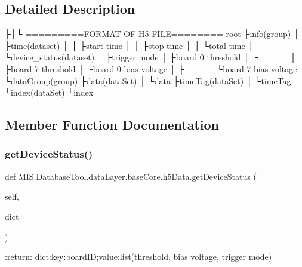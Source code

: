 \subsection{Detailed Description}
\begin{DoxyVerb}├│└
=========FORMAT OF H5 FILE========
root
 ├info(group)
 │ ├time(dataset)
 │ │ ├start time
 │ │ ├stop time
 │ │ └total time
 │ └device_status(dataset)
 │   ├trigger mode
 │   ├board 0 threshold
 │   ├~~~~~~~
 │   ├board 7 threshold
 │   ├board 0 bias voltage
 │   ├~~~~~
 │   └board 7 bias voltage
 └dataGroup(group)
    ├data(dataSet)
    │ └data
    ├timeTag(dataSet)
    │ └timeTag
    └index(dataSet)
      └index
\end{DoxyVerb}
 

\subsection{Member Function Documentation}
\mbox{\label{classMIS_1_1DatabaseTool_1_1dataLayer_1_1baseCore_1_1h5Data_a134c9bcf417cc9a85ddd6ea4f916f378}} 
\subsubsection{\texorpdfstring{get\+Device\+Status()}{getDeviceStatus()}}
{\footnotesize\ttfamily def M\+I\+S.\+Database\+Tool.\+data\+Layer.\+base\+Core.\+h5\+Data.\+get\+Device\+Status (\begin{DoxyParamCaption}\item[{}]{self,  }\item[{}]{dict }\end{DoxyParamCaption})}

\begin{DoxyVerb}:return: dict:key:boardID;value:list(threshold, bias voltage, trigger mode)
\end{DoxyVerb}
 \mbox{\label{classMIS_1_1DatabaseTool_1_1dataLayer_1_1baseCore_1_1h5Data_ab08c099d8494e79078942cc6a89fd172}} 
